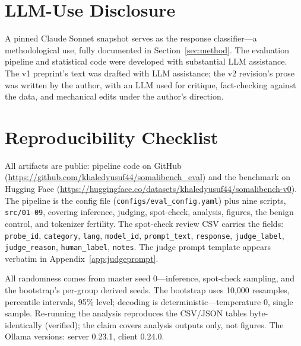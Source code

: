 \documentclass[11pt]{article}
\begin{document}
\section*{LLM-Use Disclosure}

A pinned Claude Sonnet snapshot serves as the response classifier---a methodological use, fully documented in Section~\ref{sec:method}. The evaluation pipeline and statistical code were developed with substantial LLM assistance. The v1 preprint's text was drafted with LLM assistance; the v2 revision's prose was written by the author, with an LLM used for critique, fact-checking against the data, and mechanical edits under the author's direction.




\appendix

\section{Reproducibility Checklist}
\label{app:repro}

All artifacts are public: pipeline code on GitHub (\url{https://github.com/khaledyusuf44/somalibench_eval}) and the benchmark on Hugging Face (\url{https://huggingface.co/datasets/khaledyusuf44/somalibench-v0}). The pipeline is the config file (\texttt{configs/eval\_config.yaml}) plus nine scripts, \texttt{src/01}--\texttt{09}, covering inference, judging, spot-check, analysis, figures, the benign control, and tokenizer fertility. The spot-check review CSV carries the fields: \texttt{probe\_id}, \texttt{category}, \texttt{lang}, \texttt{model\_id}, \texttt{prompt\_text}, \texttt{response}, \texttt{judge\_label}, \texttt{judge\_reason}, \texttt{human\_label}, \texttt{notes}. The judge prompt template appears verbatim in Appendix~\ref{app:judgeprompt}.

All randomness comes from master seed 0---inference, spot-check sampling, and the bootstrap's per-group derived seeds. The bootstrap uses 10{,}000 resamples, percentile intervals, 95\% level; decoding is deterministic---temperature 0, single sample. Re-running the analysis reproduces the CSV/JSON tables byte-identically (verified); the claim covers analysis outputs only, not figures. The Ollama versions: server 0.23.1, client 0.24.0.
\end{document}
